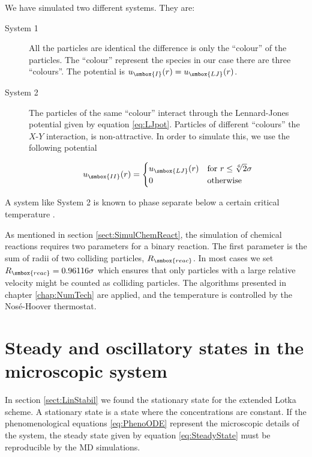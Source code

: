 We have simulated two different systems. They are:

\begin{description}
\item[System 1] All the particles are identical \ie the difference is
  only the ``colour'' of the particles. The ``colour'' represent the
  species \ie in our case there are three ``colours''. The potential
  is $u_{\smbox{I}}(r) = u_{\smbox{LJ}}(r)$.
\item[System 2] The particles of the same ``colour'' interact through
  the Lennard-Jones potential given by equation
  \eqref{eq:LJpot}. Particles of different ``colours'' \eg the $X$-$Y$
  interaction, is non-attractive. In order to simulate this, we use
  the following potential

  \begin{equation}
    u_{\smbox{II}}(r) = 
    \begin{cases}
      u_{\smbox{LJ}}(r) &\text{for $r\le \sqrt[6]{2}\sigma$} \\
      0                 &\text{otherwise}
    \end{cases}
  \end{equation}
\end{description}

A system like System 2 is known to phase separate below a certain
critical temperature \cite{Laradji96,Toxvaerd95a}.

As mentioned in section \ref{sect:SimulChemReact}, the simulation of
chemical reactions requires two parameters for a binary reaction. The
first parameter is the sum of radii of two colliding particles,
$R_{\smbox{reac}}$. In most cases we set $R_{\smbox{reac}}=0.96116\sigma$
which ensures that only particles with a large relative velocity might
be counted as colliding particles. The algorithms presented in chapter
\ref{chap:NumTech} are applied, and the temperature is controlled by the
Nos\'{e}-Hoover thermostat.


\section{Steady and oscillatory states in the microscopic system}
In section \ref{sect:LinStabil} we found the stationary state for the
extended Lotka scheme. A stationary state is a state where the
concentrations are constant. If the phenomenological equations
\eqref{eq:PhenoODE} represent the microscopic details of the system,
the steady state given by equation \eqref{eq:SteadyState} must be
reproducible by the MD simulations. 


